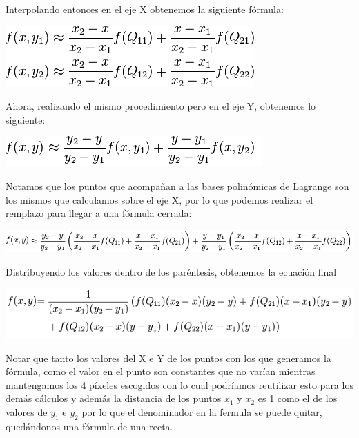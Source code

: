 Interpolando entonces en el eje X obtenemos la siguiente fórmula:

\begin{center}
\includegraphics[scale=0.75]{imagenes/bilinealX.png}\\
\end{center}


Ahora, realizando el mismo procedimiento pero en el eje Y, obtenemos lo siguiente:

\begin{center}
\includegraphics[scale=0.75]{imagenes/bilinealY.png}\\
\end{center}

Notamos que los puntos que acompañan a las bases polinómicas de Lagrange son los mismos que calculamos sobre el eje X, por lo que podemos realizar el remplazo para llegar a una fórmula cerrada:

\begin{center}
\includegraphics[scale=0.75]{imagenes/bilinealXY.png}\\
\end{center}

Distribuyendo los valores dentro de los paréntesis, obtenemos la ecuación final

\begin{center}
\includegraphics[scale=0.75]{imagenes/bilinealFinal.png}\\
\end{center}

Notar que tanto los valores del X e Y de los puntos con los que generamos la fórmula, como el valor en el punto son constantes que no varían mientras mantengamos los 4 píxeles escogidos con lo cual podríamos reutilizar esto para los demás cálculos y además la distancia de los puntos $x_1$ y $x_2$ es 1 como el de los valores de $y_1$ e $y_2$ por lo que el denominador en la fermula se puede quitar, quedándonos una fórmula de una recta.

